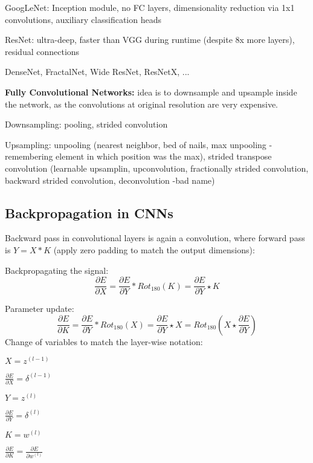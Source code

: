 \documentclass[12pt]{article}
\begin{document}
\item GoogLeNet: Inception module, no FC layers, dimensionality reduction via 1x1 convolutions, auxiliary classification heads
\item ResNet: ultra-deep, faster than VGG during runtime (despite 8x more layers), residual connections
\item DenseNet, FractalNet, Wide ResNet, ResNetX, ...
\ule
\par \textbf{Fully Convolutional Networks:} idea is to downsample and upsample inside the network, as the convolutions at original resolution are very expensive.
\ulb
\item Downsampling: pooling, strided convolution
\item Upsampling: unpooling (nearest neighbor, bed of nails, max unpooling -remembering element in which position was the max), strided transpose convolution (learnable upsamplin, upconvolution, fractionally strided convolution, backward strided convolution, deconvolution -bad name)
\ule

\subsection{Backpropagation in CNNs}
\par Backward pass in convolutional layers is again a convolution, where forward pass is $Y = X * K$ (apply zero padding to match the output dimensions):
\ulb
\item Backpropagating the signal:
\[ \frac{\partial E}{\partial X} = \frac{\partial E}{\partial Y} * Rot_{180}(K) = \frac{\partial E}{\partial Y} \star K \]
\item Parameter update:
\[ \frac{\partial E}{\partial K} = \frac{\partial E}{\partial Y} * Rot_{180}(X) = \frac{\partial E}{\partial Y} \star X = Rot_{180} \left( X \star \frac{\partial E}{\partial Y} \right) \]
\ule
Change of variables to match the layer-wise notation:
\ulb
\item $X = z^{(l-1)}$
\item $\frac{\partial E}{\partial X} = \delta^{(l-1)}$
\item $Y = z^{(l)}$
\item $\frac{\partial E}{\partial Y} = \delta^{(l)}$
\item $K = w^{(l)}$
\item $\frac{\partial E}{\partial K} = \frac{\partial E}{\partial w^{(l)}}$
\ule
\mce
\end{document}
